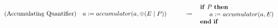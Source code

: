 \documentclass{article}
\begin{document}
\noindent\begin{minipage}{\linewidth}
\begin{align}
  \tag{Accumulating Quantifier}
  \begin{minipage}[]{0.5\textwidth}
  \begin{algorithmic}
    \State $a := accumulator(a, \oplus(E \mid P))$
  \end{algorithmic}
  \end{minipage}
  &\leadsto
  \begin{minipage}[]{0.4\textwidth}
  \begin{algorithmic}
    \If{$P$}
      \State $a := accumulator(a, E)$
    \EndIf
  \end{algorithmic}
  \end{minipage}
\end{align}
\end{minipage}

\end{document}
